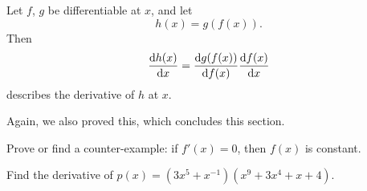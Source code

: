 \begin{thm}
Let $f$, $g$ be differentiable at $x$, and let
\begin{equation}
h(x)=g(f(x)).
\end{equation}
Then
\begin{equation}
\frac{\mathrm{d} h(x)}{\mathrm{d} x}=\frac{\mathrm{d} g(f(x))}{\mathrm{d} f(x)}\frac{\mathrm{d} f(x)}{\mathrm{d} x}
\end{equation}
describes the derivative of $h$ at $x$.
\end{thm}

Again, we also proved this, which concludes this section.


\begin{exercises}
\suggestedExercise [14] Prove or find a counter-example: if
$f'(x)=0$, then $f(x)$ is constant.

\exercise [19] Find the derivative of $p(x)=(3x^{5}+x^{-1})(x^{9}+3x^{4}+x+4)$.


\end{exercises}
